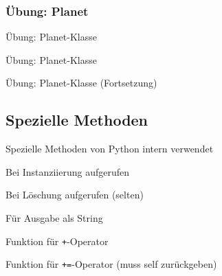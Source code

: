 \subsubsection{Übung: Planet}
\begin{frame}{Übung: Planet-Klasse}
    
\end{frame}
\begin{frame}{Übung: Planet-Klasse}
    
\end{frame}
\begin{frame}{Übung: Planet-Klasse (Fortsetzung)}
    
\end{frame}

\subsection{Spezielle Methoden}
\begin{frame}{Spezielle Methoden}
	von Python intern verwendet

	\begin{description}
        \item<1->[\tt\_\_init\_\_] Bei Instanziierung aufgerufen
		\item<2->[\tt\_\_del\_\_] Bei Löschung aufgerufen (selten)
        \item<3->[\tt\_\_str\_\_] Für Ausgabe als String
        \item<4->[\tt\_\_add\_\_] Funktion für \alert{\tt +}-Operator
        \item<5->[\tt\_\_iadd\_\_] Funktion für \alert{\tt +=}-Operator (muss self zurückgeben)
	\end{description}
\end{frame}



